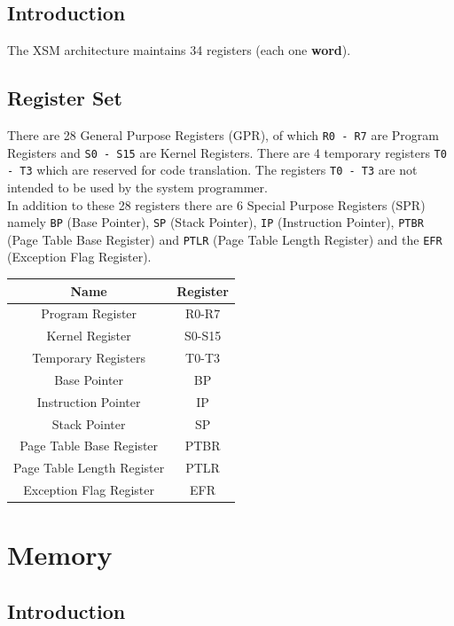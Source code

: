 \documentclass[11pt]{report}
\begin{document}
\section{Introduction}

The XSM architecture maintains 34 registers (each one \textbf{word}).

\section{Register Set}
There are 28 General Purpose Registers (GPR), of which \texttt{R0 - R7} are Program Registers and \texttt{S0 - S15} are Kernel Registers. There are 4 temporary registers \texttt{T0 - T3} which are reserved for code translation. The registers \texttt{T0 - T3} are not intended to be used by the system programmer.\\

In addition to these 28 registers there are 6 Special Purpose Registers (SPR) namely \texttt{BP} (Base Pointer), \texttt{SP} (Stack Pointer), \texttt{IP} (Instruction Pointer), \texttt{PTBR} (Page Table Base Register) and \texttt{PTLR} (Page Table Length Register) and the \texttt{EFR} (Exception Flag Register).



\begin{center}
\begin{tabular}{|c|c|}
\hline Name & Register \\ 
\hline Program Register & R0-R7 \\ 
\hline Kernel Register & S0-S15 \\ 
\hline Temporary Registers & T0-T3 \\ 
\hline Base Pointer & BP \\ 
\hline Instruction Pointer & IP \\ 
\hline Stack Pointer & SP \\ 
\hline Page Table Base Register & PTBR \\
\hline Page Table Length Register & PTLR \\
\hline Exception Flag Register & EFR \\
\hline
\end{tabular} 
\end{center}


\chapter{Memory}
\label{sec:mem}

\section{Introduction}
\end{document}

